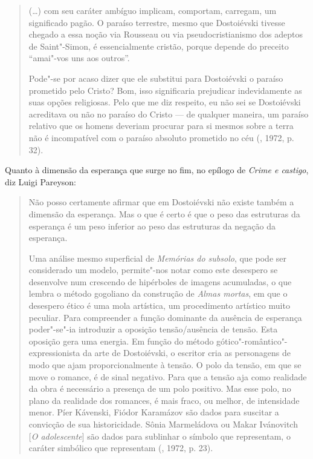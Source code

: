 \begin{quotation}
(\ldots{}) com seu caráter ambíguo implicam, comportam, carregam, um
significado pagão. O paraíso terrestre, mesmo que Dostoiévski tivesse
chegado a essa noção via Rousseau ou via pseudocristianismo dos adeptos
de Saint"-Simon, é essencialmente cristão, porque depende do preceito
``amai"-vos uns aos outros''.

Pode"-se por acaso dizer que ele substitui para Dostoiévski o paraíso
prometido pelo Cristo? Bom, isso significaria prejudicar indevidamente
as suas opções religiosas. Pelo que me diz respeito, eu não sei se
Dostoiévski acreditava ou não no paraíso do Cristo --- de qualquer
maneira, um paraíso relativo que os homens deveriam procurar para si
mesmos sobre a terra não é incompatível com o paraíso absoluto prometido
no céu (, 1972, p. 32).
\end{quotation}

Quanto à dimensão da esperança que surge no fim, no epílogo de
\emph{Crime e castigo}, diz Luigi Pareyson:

\begin{quotation}
Não posso certamente afirmar que em Dostoiévski não existe também a
dimensão da esperança. Mas o que é certo é que o peso das estruturas da
esperança é um peso inferior ao peso das estruturas da negação da
esperança.

Uma análise mesmo superficial de \emph{Memórias do subsolo}, que pode
ser considerado um modelo, permite"-nos notar como este desespero se
desenvolve num crescendo de hipérboles de imagens acumuladas, o que
lembra o método gogoliano da construção de \emph{Almas mortas}, em que o
desespero ético é uma mola artística, um procedimento artístico muito
peculiar. Para compreender a função dominante da ausência de esperança
poder"-se"-ia introduzir a oposição tensão/ausência de tensão. Esta
oposição gera uma energia. Em função do método
gótico"-romântico"-expressionista da arte de Dostoiévski, o escritor cria
as personagens de modo que ajam proporcionalmente à tensão. O polo da
tensão, em que se move o romance, é de sinal negativo. Para que a tensão
aja como realidade da obra é necessário a presença de um polo positivo.
Mas esse polo, no plano da realidade dos romances, é mais fraco, ou
melhor, de intensidade menor. Píer Kávenski, Fiódor Karamázov são dados
para suscitar a convicção de sua historicidade. Sônia Marmeládova ou
Makar Ivánovitch [\emph{O adolescente}] são dados para sublinhar o
símbolo que representam, o caráter simbólico que representam (, 1972, p. 23).
\end{quotation}

